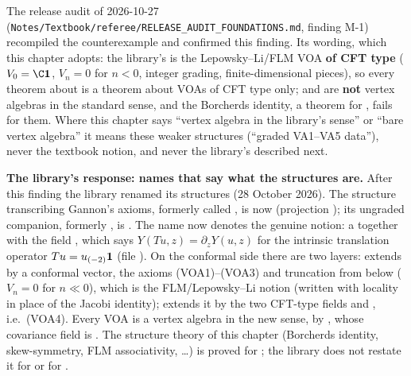\begin{warning}[title={The main finding of this chapter: Gannon's axioms, \texttt{PreVertexAlgebra}, do not give a vertex algebra in the textbook sense}]
The release audit of 2026-10-27 (\texttt{Notes/\allowbreak Textbook/\allowbreak referee/\allowbreak RELEASE\_AUDIT\_FOUNDATIONS.md},
finding M-1) recompiled the counterexample and confirmed this finding. Its wording, which this chapter adopts: the
library's  is the Lepowsky--Li/FLM VOA \textbf{of CFT type} ($V_0 = \C\lthreevac$,
$V_n = 0$ for $n<0$, integer grading, finite-dimensional pieces), so every theorem about 
is a theorem about VOAs of CFT type only;  and  are \textbf{not} vertex algebras
in the standard sense, and the Borcherds identity, a theorem for , fails for them. Where this
chapter says ``vertex algebra in the library's sense'' or ``bare vertex algebra'' it means these weaker structures
(``graded VA1--VA5 data''), never the textbook notion, and never the library's  described next.

\textbf{The library's response: names that say what the structures are.} After this finding the library renamed its
structures (28 October 2026). The structure transcribing Gannon's axioms, formerly called , is now
 (projection ); its ungraded companion, formerly , is
. The name  now denotes the genuine notion: a  together with
the field , which says $Y(Tu,z) = \partial_zY(u,z)$ for the intrinsic translation operator
$Tu = u_{(-2)}\mathbf{1}$ (file ). On the conformal
side there are two layers:  extends  by a conformal vector,
the axioms (VOA1)--(VOA3) and truncation from below ($V_n = 0$ for $n\ll0$), which is the FLM/Lepowsky--Li notion
(written with locality in place of the Jacobi identity);  extends it by the two
CFT-type fields  and , i.e.\ (VOA4). Every VOA is a vertex algebra in the new sense,
by , whose covariance field is
. The structure theory of this chapter (Borcherds identity,
skew-symmetry, FLM associativity, \dots) is proved for ; the library does not restate it
for  or for .
\end{warning}

